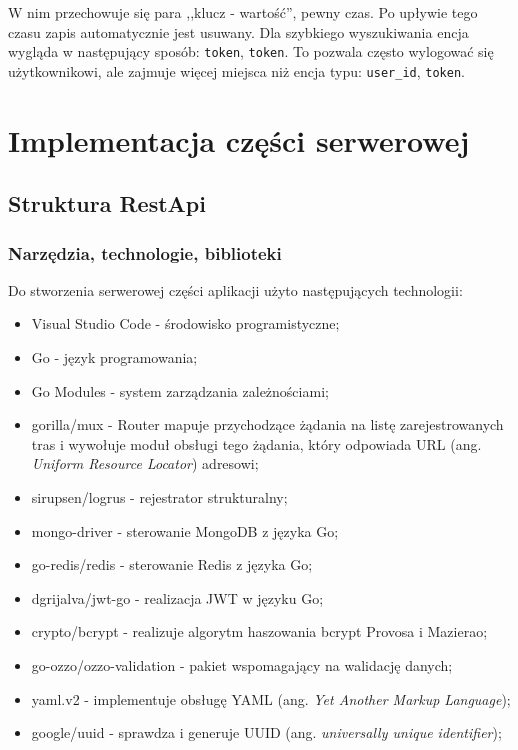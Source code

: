 W nim przechowuje się para ,,klucz - wartość'', pewny czas. Po upływie tego czasu zapis automatycznie jest usuwany.
Dla szybkiego wyszukiwania encja wygląda w następujący sposób: \texttt{token}, \texttt{token}. To pozwala często wylogować się użytkownikowi, ale zajmuje więcej miejsca niż encja typu: \texttt{user\_id}, \texttt{token}.

\section{Implementacja części serwerowej}
% 
\subsection{Struktura RestApi}
% 
\subsubsection{Narzędzia, technologie, biblioteki}
Do stworzenia serwerowej części aplikacji użyto następujących technologii:
\begin{itemize}
\item Visual Studio Code - środowisko programistyczne;
\item Go - język programowania;
\item Go Modules - system zarządzania zależnościami;
\item gorilla/mux - Router mapuje przychodzące żądania na listę zarejestrowanych tras i wywołuje moduł obsługi tego żądania, który odpowiada URL (ang. \textit{Uniform Resource Locator}) adresowi;
\item sirupsen/logrus - rejestrator strukturalny;
\item mongo-driver - sterowanie MongoDB z języka Go;
\item go-redis/redis - sterowanie Redis z języka Go;
\item dgrijalva/jwt-go - realizacja JWT w języku Go;
\item crypto/bcrypt - realizuje algorytm haszowania bcrypt Provosa i Mazierao;
\item go-ozzo/ozzo-validation - pakiet wspomagający na walidację danych;
\item yaml.v2 - implementuje obsługę YAML (ang. \textit{Yet Another Markup Language});
\item google/uuid - sprawdza i generuje UUID (ang. \textit{universally unique identifier});
\end{itemize}

% 
